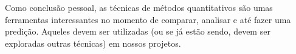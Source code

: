 \documentclass[12pt]{article}
\begin{document}
Como conclusão pessoal, as técnicas de métodos quantitativos são umas ferramentas interessantes no momento de comparar, analisar e até fazer uma predição. Aqueles devem ser utilizadas (ou se já estão sendo, devem ser exploradas outras técnicas) em nossos projetos.


%


\end{document}
